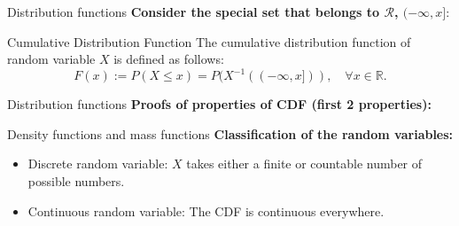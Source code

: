 \documentclass [aspectratio=169]{beamer}
\newcommand{\mc}{\mathcal}
\begin{document}
\begin{frame}{Distribution functions}
\textbf{Consider the special set that belongs to $\mc{R}$, $(-\infty, x]$}:
\begin{block}{Cumulative Distribution Function}
The cumulative distribution function of random variable $X$ is defined as follows:
$$ 
F(x):= P(X \le x) = P(X^{-1}((-\infty,x])), \quad \forall x \in \mathbb{R}.
$$
\end{block}
\vspace{0.1in}
\end{frame}

\begin{frame}{Distribution functions}
    \textbf{Proofs of properties of CDF (first 2 properties):}\\
    \vspace{2.5in}
    
\end{frame}

\begin{frame}{Density functions and mass functions}
    \textbf{Classification of the random variables:}\\
    \begin{itemize}
        \item Discrete random variable: $X$ takes either a finite or countable number of possible numbers. 
        \item Continuous random variable: The CDF is continuous everywhere. 
    \end{itemize}
    \vspace{0.1in}
\end{frame}
\end{document}

